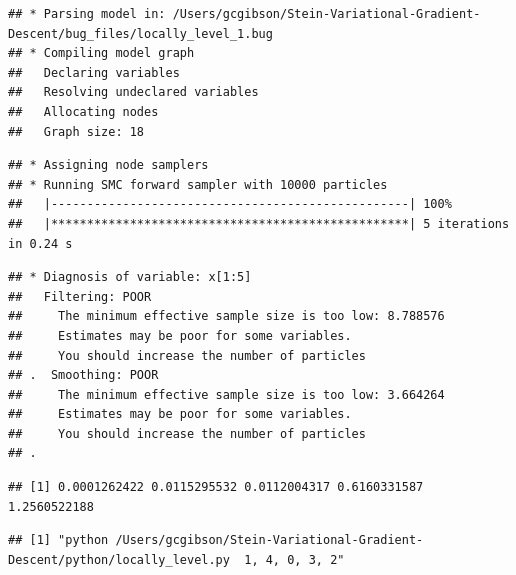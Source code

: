 \documentclass[]{article}
\begin{document}
\begin{verbatim}
## * Parsing model in: /Users/gcgibson/Stein-Variational-Gradient-Descent/bug_files/locally_level_1.bug
## * Compiling model graph
##   Declaring variables
##   Resolving undeclared variables
##   Allocating nodes
##   Graph size: 18
\end{verbatim}

\begin{verbatim}
## * Assigning node samplers
## * Running SMC forward sampler with 10000 particles
##   |--------------------------------------------------| 100%
##   |**************************************************| 5 iterations in 0.24 s
\end{verbatim}

\begin{verbatim}
## * Diagnosis of variable: x[1:5] 
##   Filtering: POOR
##     The minimum effective sample size is too low: 8.788576 
##     Estimates may be poor for some variables.
##     You should increase the number of particles
## .  Smoothing: POOR
##     The minimum effective sample size is too low: 3.664264 
##     Estimates may be poor for some variables.
##     You should increase the number of particles
## .
\end{verbatim}

\begin{verbatim}
## [1] 0.0001262422 0.0115295532 0.0112004317 0.6160331587 1.2560522188
\end{verbatim}

\begin{verbatim}
## [1] "python /Users/gcgibson/Stein-Variational-Gradient-Descent/python/locally_level.py  1, 4, 0, 3, 2"
\end{verbatim}
\end{document}
